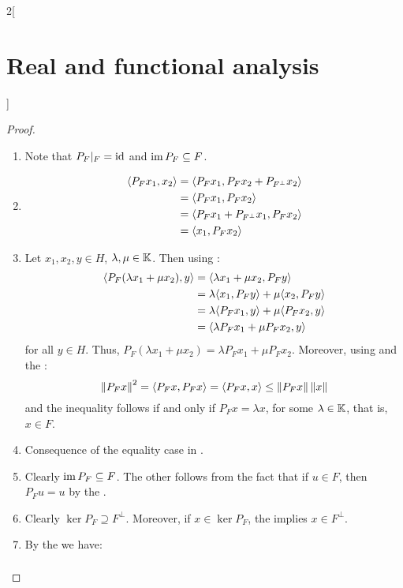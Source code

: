 \documentclass[../../../main_math.tex]{subfiles}
\begin{document}
\begin{multicols}{2}[\section{Real and functional analysis}]
\begin{corollary}
  \end{corollary}
  \begin{proof}
    \begin{enumerate}
      \item Note that $P_F|_{F}=\mathrm{id}$ and $\operatorname{im} P_F\subseteq F$.
      \item
            \begin{align*}
              {\left\langle P_Fx_1,x_2\right\rangle} & ={\left\langle P_Fx_1,P_Fx_2+P_{F^\perp}x_2\right\rangle} \\
                                 & ={\left\langle P_Fx_1,P_Fx_2\right\rangle}                \\
                                 & ={\left\langle P_Fx_1+P_{F^\perp}x_1,P_Fx_2\right\rangle} \\
                                 & ={\left\langle x_1,P_Fx_2\right\rangle}
            \end{align*}
      \item Let $x_1,x_2,y\in H$, $\lambda,\mu\in\mathbb{K}$. Then using :
            \begin{align*}
              {\left\langle P_F(\lambda x_1+\mu x_2),y\right\rangle} & ={\left\langle\lambda x_1+\mu x_2,P_Fy\right\rangle}            \\
                                                 & =\lambda{\left\langle x_1,P_Fy\right\rangle}+\mu{\left\langle x_2,P_Fy\right\rangle} \\
                                                 & =\lambda{\left\langle P_Fx_1,y\right\rangle}+\mu{\left\langle P_Fx_2,y\right\rangle} \\
                                                 & ={\left\langle\lambda P_Fx_1+\mu P_Fx_2,y\right\rangle}
            \end{align*}
            for all $y\in H$. Thus, $P_F(\lambda x_1+\mu x_2)=\lambda P_Fx_1+\mu P_Fx_2$. Moreover, using  and the :
            $$\left\|P_Fx\right\|^2={\left\langle P_Fx,P_Fx\right\rangle}={\left\langle P_Fx,x\right\rangle}\leq\left\|P_Fx\right\|\left\|x\right\|$$
            and the inequality follows if and only if $P_Fx=\lambda x$, for some $\lambda\in\mathbb{K}$, that is, $x\in F$.
      \item Consequence of the equality case in .
      \item Clearly $\operatorname{im} P_F\subseteq F$. The other follows from the fact that if $u\in F$, then $P_Fu=u$ by the .
      \item Clearly $\ker P_F\supseteq F^\perp$. Moreover, if $x\in \ker P_F$, the  implies $x\in F^\perp$.
      \item By the  we have:
            \begin{align*}

\end{align*}
\end{enumerate}
\end{proof}
\end{multicols}
\end{document}
